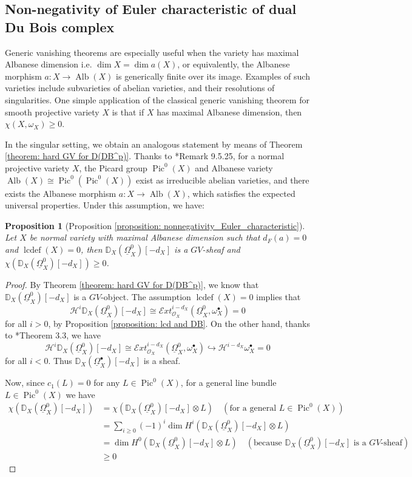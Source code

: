\documentclass[11pt]{amsart}
\newtheorem{proposition}[equation]{Proposition}
\theoremstyle{definition}
\theoremstyle{plain}
\newcommand{\E}{\mathcal E}
\renewcommand{\H}{\mathcal H}
\renewcommand{\O}{\mathcal O}
\newcommand{\DD}{\mathbb D}
\newcommand{\sExt}{\E xt} %
\newcommand{\DB}{\underline{\Omega}} %
\DeclareMathOperator{\Pic}{Pic}
\DeclareMathOperator{\Alb}{Alb}
\DeclareMathOperator{\lcdef}{lcdef}
\begin{document}
\bigskip

\subsection{Non-negativity of Euler characteristic of dual Du Bois complex}

Generic vanishing theorems are especially useful when the variety has maximal Albanese dimension i.e. $\dim X = \dim a(X)$, or equivalently, the Albanese morphism $a: X \to \Alb(X)$ is generically finite over its image. Examples of such varieties include subvarieties of abelian varieties, and their resolutions of singularities. One simple application of the classical generic vanishing theorem for smooth projective variety $X$ is that if $X$ has maximal Albanese dimension, then $\chi(X, \omega_X)\ge 0$. 

In the singular setting, we obtain an analogous statement by means of Theorem \ref{theorem: hard GV for D(DB^p)}. Thanks to \cite{FGA_explained_picard_scheme}*{Remark 9.5.25}, for a normal projective variety $X$, the Picard group $\Pic^0(X)$ and Albanese variety $\Alb(X) \cong \Pic^0(\Pic^0(X))$ exist as irreducible abelian varieties, and there exists the Albanese morphism $a: X\to \Alb(X)$, which satisfies the expected universal properties. Under this assumption, we have:   

\begin{proposition}[Proposition \ref{proposition: nonnegativity_Euler_characteristic}]
    Let $X$ be normal variety with maximal Albanese dimension such that $d_F(a) = 0$ and $\lcdef(X)=0$, then $\DD_X(\DB_X^0)[-d_X]$ is a $GV$-sheaf and $\chi(\DD_X(\DB_X^0)[-d_X])\ge 0$.  
\end{proposition}
\begin{proof}
    By Theorem \ref{theorem: hard GV for D(DB^p)}, we know that $\DD_X(\DB_X^0)[-d_X]$ is a $GV$-object. The assumption $\lcdef(X) = 0$ implies that 
    \[\H^i \DD_X(\DB_X^0)[-d_X] \cong \sExt_{\O_X}^{i-d_X}(\DB_X^0, \omega_X^\bullet) = 0\]
    for all $i > 0$, by Proposition \ref{proposition: lcd and DB}. On the other hand, thanks to \cite{DB_deform}*{Theorem 3.3}, we have 
    \[\H^i \DD_X(\DB_X^0)[-d_X] \cong \sExt_{\O_X}^{i-d_X}(\DB_X^0, \omega_X^\bullet) \hookrightarrow \H^{i-d_X} \omega_X^\bullet = 0\]
    for all $i < 0$. Thus $\DD_X(\DB_X^\bullet)[-d_X]$ is a sheaf. 

    Now, since $c_1(L) = 0$ for any $L\in \Pic^0(X)$, for a general line bundle $L\in \Pic^0(X)$ we have
    \begin{align*}
        \chi(\DD_X(\DB_X^0)[-d_X]) &= \chi(\DD_X(\DB_X^0)[-d_X]\otimes L) \quad (\text{for a general } L\in \Pic^0(X)) \\
        &= \sum_{i\ge 0} (-1)^i \dim H^i(\DD_X(\DB_X^0)[-d_X] \otimes L) \\
        &= \dim H^0(\DD_X(\DB_X^0)[-d_X] \otimes L) \quad (\text{because } \DD_X(\DB_X^0)[-d_X] \text{ is a $GV$-sheaf}) \\
        &\ge 0
    \end{align*}
\end{proof}
\end{document}
